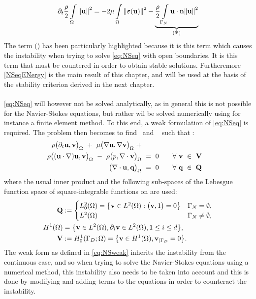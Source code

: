 \begin{equation}\label{NSeqENergy}
\partial_t\frac{\rho}{2}\fint\norm{\bmu}^2 = -2\mu\fint\norm{\bm{\varepsilon}(\bmu)}^2 - \underbrace{\frac{\rho}{2}\bint\bmu\cdot\bmn\norm{\bmu}^2}_{(\text{\large \textasteriskcentered})}
\end{equation}
The term ({\large \textasteriskcentered}) has been particularly highlighted because it is this term which causes the instability when trying to solve \autoref{eq:NSeq} with open boundaries. It is this term that must be countered in order to obtain stable solutions. Furtheremore \eqref{NSeqENergy} is the main result of this chapter, and will be used at the basis of the stability criterion derived in the next chapter.\\
\\
\autoref{eq:NSeq} will however not be solved analytically, as in general this is not possible for the Navier-Stokes equations, but rather wil be solved numerically using for instance a finite element method. To this end, a weak formulation of \eqref{eq:NSeq}  is required. The problem then becomes to find \bmu~and ~ such that \cite[433]{alfioquarteroni2014}:
\begin{align}\label{eq:NSweak}
\begin{split}
    \rho\big(\partial_t{\textbf{u}},{\textbf{v}}\big)_{\Omega} ~+~
    \mu\big(\nabla{\textbf{u}},\nabla{\textbf{v}}\big)_{\Omega} ~+~\\
    \rho\big(\qty({\textbf{u}}\cdot\nabla){\textbf{u}},{\textbf{v}}\big)_{\Omega} ~-~
    \rho\big(p,\nabla\cdot{\textbf{v}}\big)_{\Omega} ~&=~ 0 \qquad \forall~{\textbf{v}}~\in~\mathbf{V}\\
    \big(\nabla\cdot{\textbf{u}},\textbf{q}\big)_{\Omega} ~&=~ 0 \qquad \forall~\textbf{q}~\in~\mathbf{Q}
\end{split}
\end{align}
where the usual inner product  and the following sub-spaces of the Lebesgue function space  of square-integrable functions on \mathm{\Omega} are used:
\begin{align*}
\mathbf{Q} &:= \begin{cases}L^2_0\qty(\Omega) = \qty{{\textbf{v}}\in L^2\qty(\Omega) : \big({\textbf{v}},1\big)=0} & \Gamma_N = \emptyset,\\
L^2\qty(\Omega) & \Gamma_N \neq \emptyset,\end{cases}\\
H^1\qty(\Omega) &= \qty{{\textbf{v}}\in L^2\qty(\Omega), \partial_i {\textbf{v}}\in L^2\qty(\Omega), 1\leq i \leq d},\\
\mathbf{V} &:= H^1_0\qty(\Gamma_D;\Omega) = \qty{{\textbf{v}}\in H^1\qty(\Omega), {\textbf{v}}_{|\Gamma_D} = 0}.\\
\end{align*}
The weak form as defined in \eqref{eq:NSweak} inherits the instability from the continuous case, and so when trying to solve the Navier-Stokes equations using a numerical method, this instability also needs to be taken into account and this is done by modifying and adding terms to the equations in order to counteract the instability.

